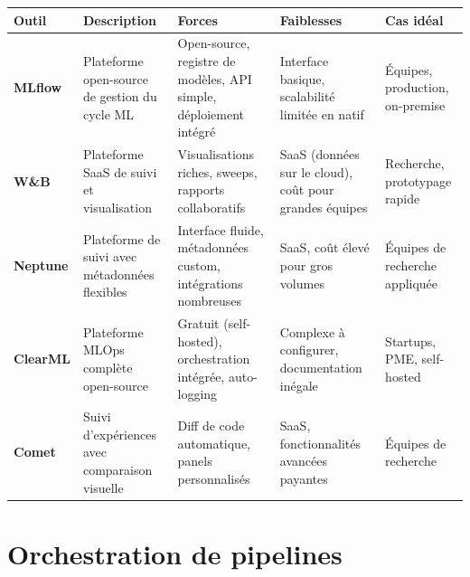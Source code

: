 \begin{center}
\small
\begin{tabular}{@{}p{1.8cm}p{3cm}p{3cm}p{3cm}p{2cm}@{}}
\toprule
\textbf{Outil} & \textbf{Description} & \textbf{Forces} &
  \textbf{Faiblesses} & \textbf{Cas id\'eal} \\
\midrule
\textbf{MLflow} & Plateforme open-source de gestion du cycle ML &
  Open-source, registre de mod\`eles, API simple, d\'eploiement int\'egr\'e &
  Interface basique, scalabilit\'e limit\'ee en natif &
  \'Equipes, production, on-premise \\
\addlinespace
\textbf{W\&B} & Plateforme SaaS de suivi et visualisation &
  Visualisations riches, sweeps, rapports collaboratifs &
  SaaS (donn\'ees sur le cloud), co\^ut pour grandes \'equipes &
  Recherche, prototypage rapide \\
\addlinespace
\textbf{Neptune} & Plateforme de suivi avec m\'etadonn\'ees flexibles &
  Interface fluide, m\'etadonn\'ees custom, int\'egrations nombreuses &
  SaaS, co\^ut \'elev\'e pour gros volumes &
  \'Equipes de recherche appliqu\'ee \\
\addlinespace
\textbf{ClearML} & Plateforme MLOps compl\`ete open-source &
  Gratuit (self-hosted), orchestration int\'egr\'ee, auto-logging &
  Complexe \`a configurer, documentation in\'egale &
  Startups, PME, self-hosted \\
\addlinespace
\textbf{Comet} & Suivi d'exp\'eriences avec comparaison visuelle &
  Diff de code automatique, panels personnalis\'es &
  SaaS, fonctionnalit\'es avanc\'ees payantes &
  \'Equipes de recherche \\
\bottomrule
\end{tabular}
\end{center}

\section{Orchestration de pipelines}
\label{app:orchestration}


